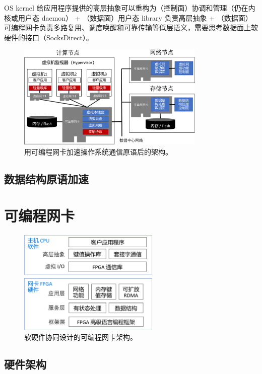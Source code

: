 OS kernel 给应用程序提供的高层抽象可以重构为（控制面）协调和管理（仍在内核或用户态 daemon） + （数据面）用户态 library 负责高层抽象 + （数据面）可编程网卡负责多路复用、调度唤醒和可靠传输等低层语义，需要思考数据面上软硬件的接口（SocksDirect）。

\begin{figure}[htbp]
	\centering
	\includegraphics[width=0.8\textwidth]{figures/os_primitives_accel.pdf}
	\caption{用可编程网卡加速操作系统通信原语后的架构。}
	\label{arch:fig:os-primitives-accel}
\end{figure}

\subsection{数据结构原语加速}


\section{可编程网卡}



\begin{figure}[htbp]
	\centering
	\includegraphics[width=0.6\textwidth]{figures/sw_hw_codesign.pdf}
	\caption{软硬件协同设计的可编程网卡架构。}
	\label{arch:fig:sw-hw-codesign}
\end{figure}


\subsection{硬件架构}


